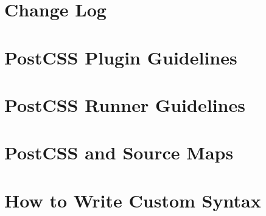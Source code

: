 \documentclass[twoside]{book}
\newcommand{\+}{\discretionary{\mbox{\scriptsize$\hookleftarrow$}}{}{}}
\begin{document}
\chapter{Change Log}
\label{md__c_1_workspace_demo_src_main_script_node_modules_postcss-modules-local-by-default_node_modules_postcss__c_h_a_n_g_e_l_o_g}

\chapter{Post\+C\+SS Plugin Guidelines}
\label{md__c_1_workspace_demo_src_main_script_node_modules_postcss-modules-local-by-default_node_module74d2938ea46ff63ba00e71c19b96b41e}

\chapter{Post\+C\+SS Runner Guidelines}
\label{md__c_1_workspace_demo_src_main_script_node_modules_postcss-modules-local-by-default_node_module4b64d576a5cd89fed4729e9ff8e7be7e}

\chapter{Post\+C\+SS and Source Maps}
\label{md__c_1_workspace_demo_src_main_script_node_modules_postcss-modules-local-by-default_node_modules_postcss_docs_source-maps}

\chapter{How to Write Custom Syntax}
\label{md__c_1_workspace_demo_src_main_script_node_modules_postcss-modules-local-by-default_node_modules_postcss_docs_syntax}

\end{document}
